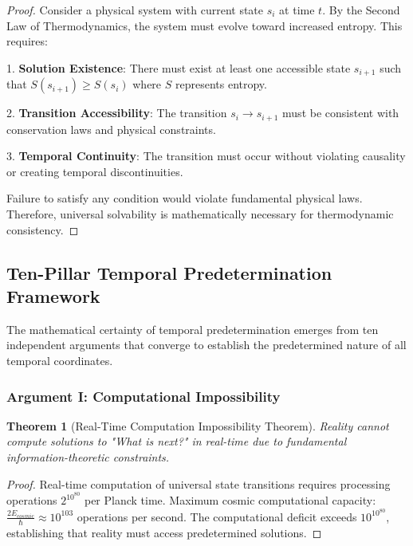 \documentclass[12pt,a4paper]{article}
\newtheorem{theorem}{Theorem}[section]
\begin{document}
\begin{proof}
Consider a physical system with current state $s_i$ at time $t$. By the Second Law of Thermodynamics, the system must evolve toward increased entropy. This requires:

1. \textbf{Solution Existence}: There must exist at least one accessible state $s_{i+1}$ such that $S(s_{i+1}) \geq S(s_i)$ where $S$ represents entropy.

2. \textbf{Transition Accessibility}: The transition $s_i \rightarrow s_{i+1}$ must be consistent with conservation laws and physical constraints.

3. \textbf{Temporal Continuity}: The transition must occur without violating causality or creating temporal discontinuities.

Failure to satisfy any condition would violate fundamental physical laws. Therefore, universal solvability is mathematically necessary for thermodynamic consistency.
\end{proof}

\subsection{Ten-Pillar Temporal Predetermination Framework}

The mathematical certainty of temporal predetermination emerges from ten independent arguments that converge to establish the predetermined nature of all temporal coordinates.

\subsubsection{Argument I: Computational Impossibility}

\begin{theorem}[Real-Time Computation Impossibility Theorem]
Reality cannot compute solutions to "What is next?" in real-time due to fundamental information-theoretic constraints.
\end{theorem}

\begin{proof}
Real-time computation of universal state transitions requires processing operations $2^{10^{80}}$ per Planck time. Maximum cosmic computational capacity: $\frac{2E_{cosmic}}{\hbar} \approx 10^{103}$ operations per second. The computational deficit exceeds $10^{10^{80}}$, establishing that reality must access predetermined solutions.
\end{proof}
\end{document}
